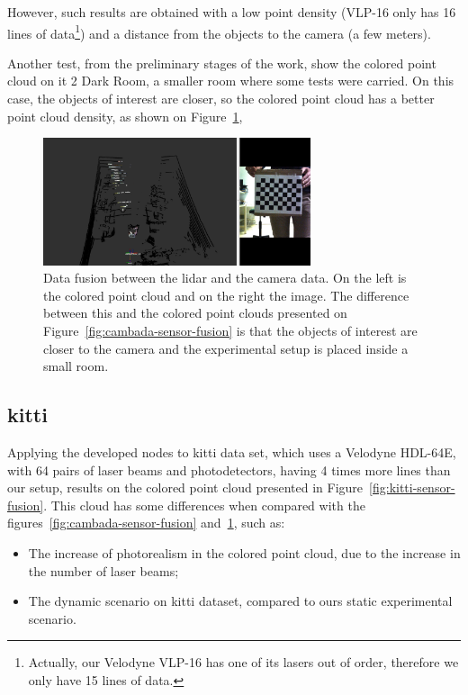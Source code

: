 However, such results are obtained with a low point density (VLP-16 only has 16 lines of data\footnote{Actually, our Velodyne VLP-16 has one of its lasers out of order, therefore we only have 15 lines of data.}) and a distance from the objects to the camera (a few meters). 

Another test, from the preliminary stages of the work, show the colored point cloud on \ac{it} 2 Dark Room, a smaller room where some tests were carried. On this case, the objects of interest are closer, so the colored point cloud has a better point cloud density, as shown on Figure~\ref{fig:dark-room-sensor-fusion}, 

\begin{figure}[!ht]
	\centering
	\includegraphics[width=0.7\textwidth]{img/sensor_fusion/dark-room-sensor-fusion.png}
\caption[Example of preliminar data fusion on \ac{it} 2 Dark Room.]{Data fusion between the \ac{lidar} and the camera data. On the left is the colored point cloud and on the right the image. The difference between this and the colored point clouds presented on Figure~\ref{fig:cambada-sensor-fusion} is that the objects of interest are closer to the camera and the experimental setup is placed inside a small room.}
	\label{fig:dark-room-sensor-fusion}
\end{figure}

\subsection{\ac{kitti}}
\label{subsec:sensor-fusion:kitti}
Applying the developed nodes to \ac{kitti} data set, which uses a Velodyne HDL-64E, with 64 pairs of laser beams and photodetectors, having 4 times more lines than our setup, results on the colored point cloud presented in Figure~\ref{fig:kitti-sensor-fusion}. This cloud has some differences when compared with the figures~\ref{fig:cambada-sensor-fusion} and~\ref{fig:dark-room-sensor-fusion}, such as:

\begin{itemize}
	\item The increase of photorealism in the colored point cloud, due to the increase in the number of laser beams;
	\item The dynamic scenario on \ac{kitti} dataset, compared to ours static experimental scenario.
\end{itemize}

